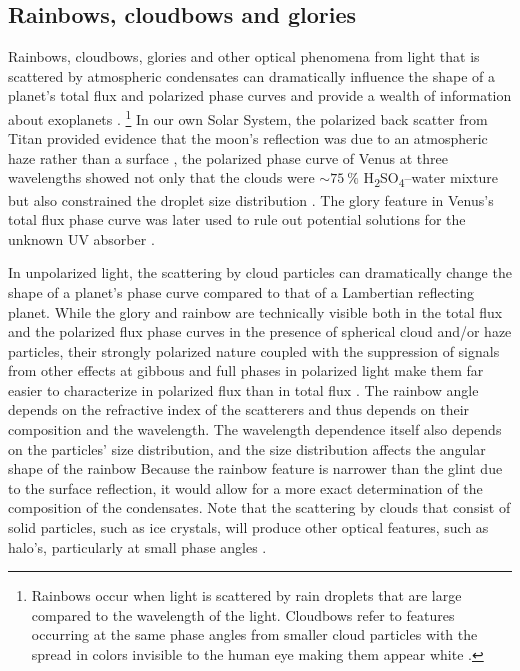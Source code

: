 \documentclass[
    usenatbib,
]{mnras}
\begin{document}

\subsection{Rainbows, cloudbows and glories}

Rainbows, cloudbows, glories and other optical phenomena from light that is 
scattered by atmospheric condensates can dramatically influence the shape of a planet's total flux and polarized phase curves and provide a wealth of information 
about exoplanets \citep{karalidi2012rainbow, stam2008,Bailey2007,2014A&A...566L...1G}.%
\footnote{
    Rainbows occur when light is scattered by rain droplets that are large compared to the wavelength of the light. Cloudbows refer to features occurring at the same phase angles from smaller cloud particles with the spread in colors invisible to the human eye making them appear white \citet[see][for further discussion]{Bailey2007}.  
}
%
In our own Solar System, the polarized back scatter from Titan provided evidence that the moon's reflection was due to an atmospheric haze rather than a surface \citep{zellner1973polarization}, the polarized phase curve of Venus at three wavelengths showed not only that the clouds were $\sim\qty{75}{\percent}$ H\textsubscript{2}SO\textsubscript{4}--water mixture but also constrained the droplet size distribution \citep{hansenhovenier1974}. 
The glory feature in Venus's total flux phase curve was later used to rule out potential solutions for the unknown UV absorber \citep{petrova2018glory}.

In unpolarized light, the scattering by cloud particles can dramatically change the shape of a planet's phase curve compared to that of a 
Lambertian reflecting planet.
%
While the glory and rainbow are technically visible both in the total flux
and the polarized flux phase curves
in the presence of spherical cloud and/or haze particles, their strongly polarized nature coupled with the suppression of signals from other effects at gibbous and full phases in polarized light make them far easier to characterize in polarized flux than in total flux \citep{karalidi2011, stam2008, treesandstam2019}.
%
The rainbow angle depends on the refractive index of the scatterers and thus depends on their composition and the wavelength. 
The wavelength dependence itself also depends on the particles' size distribution, and the size distribution affects the angular shape of the rainbow \citep{karalidi2011}
%
Because the rainbow feature is narrower than the glint due to the surface reflection, it would 
allow for a more exact determination of the composition of the condensates.
%
Note that the scattering by clouds that consist of solid particles, 
such as ice crystals, will produce other optical features, such as halo's, particularly at small phase angles \citep{bailey2007, hansentravis1974, karalidi2012rainbow}.
%
\end{document}
